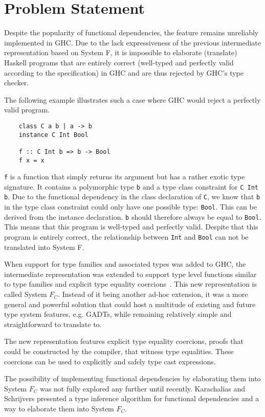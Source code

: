 \section{Problem Statement}
Despite the popularity of functional dependencies, the feature remains unreliably
implemented in GHC. Due to the lack expressiveness of the previous intermediate
representation based on System F, it is impossible to elaborate (translate)
Haskell programs that are entirely correct (well-typed and perfectly valid
according to the specification) in GHC and are thus rejected by GHC's type checker.

The following example illustrates such a case where GHC would reject a perfectly
valid program.
\begin{verbatim}
    class C a b | a -> b
    instance C Int Bool

    f :: C Int b => b -> Bool
    f x = x
\end{verbatim}

\texttt{f} is a function that simply returns its argument but has a rather
exotic type signature. It contains a polymorphic type \texttt{b} and a type
class constraint for \texttt{C Int b}. Due to the functional dependency in the
class declaration of \texttt{C}, we know that \texttt{b} in the type class
constraint could only have one possible type: \texttt{Bool}. This can be
derived from the instance declaration. \texttt{b} should therefore always be
equal to \texttt{Bool}. This means that this program is well-typed and perfectly
valid. Despite that this program is entirely correct, the relationship between
\texttt{Int} and \texttt{Bool} can not be translated into System F.

When support for type families and associated types was added to GHC, the
intermediate representation was extended to support type level functions similar
to type families and explicit type equality coercions~\cite{Sulzmann:2007:SFT:1190315.1190324}. This new representation
is called System $F_C$. Instead of it being another ad-hoc extension, it was a
more general and powerful solution that could host a multitude of existing and
future type system features, e.g. GADTs, while remaining relatively simple
and straightforward to translate to.

The new representation features explicit type equality coercions, proofs that
could be constructed by the compiler, that witness type equalities. These
coercions can be used to explicitly and safely type cast expressions.

The possibility of implementing functional dependencies by elaborating them into
System $F_C$ was not fully explored any further until recently. Karachalias and
Schrijvers\cite{Karachalias:2017:EFD:3156695.3122966} presented a type
inference algorithm for functional dependencies and a way to elaborate them into
System $F_C$.

